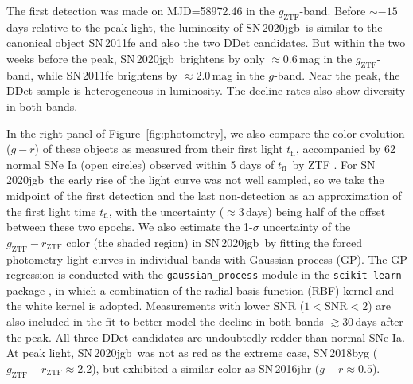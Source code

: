 \documentclass[twocolumn]{aastex631}
\newcommand{\sn}{SN\,2020jgb}
\newcommand{\tfl}{$t_\mathrm{fl}$}
\newcommand{\adam}[1]{\textcolor{red}{[AAM: #1]}}
\newcommand{\chang}[1]{\textcolor{blue}{[Chang: #1]}}
\begin{document}
The first detection was made on MJD=58972.46 in the $g_\mathrm{ZTF}$-band. Before $\sim$$-15$\,days relative to the peak light, the luminosity of \sn\ is similar to the canonical object SN\,2011fe and also the two DDet candidates. But within the two weeks before the peak, \sn\ brightens by only $\approx$0.6\,mag in the $g_\mathrm{ZTF}$-band, while SN\,2011fe brightens by $\approx$2.0\,mag in the $g$-band. %
Near the peak, the DDet sample is heterogeneous in luminosity. The decline rates also show diversity in both bands. %

In the right panel of Figure~\ref{fig:photometry}, we also compare the color evolution ($g-r$) of these objects as measured from their first light \tfl, accompanied by 62 normal SNe Ia (open circles) observed within 5 days of \tfl\ by ZTF \citep[from][]{Bulla2020}. For \sn\, the early rise of the light curve was not well sampled, so we take the midpoint of the first detection and the last non-detection as an approximation of the first light time \tfl, with the uncertainty ($\approx$3\,days) being half of the offset between these two epochs. We also estimate the 1-$\sigma$ uncertainty of the $g_\mathrm{ZTF}-r_\mathrm{ZTF}$ color (the shaded region) in \sn\ by fitting the forced photometry light curves in individual bands with Gaussian process (GP). The GP regression is conducted with the \texttt{gaussian\_process} module in the \texttt{scikit-learn} package \citep{scikit-learn}, in which a combination of the radial-basis function (RBF) kernel and the white kernel is adopted. Measurements with lower SNR ($1<\mathrm{SNR}<2$) are also included in the fit to better model the decline in both bands $\gtrsim$30\,days after the peak. %
All three DDet candidates are undoubtedly redder than normal SNe Ia. At peak light, \sn\ was not as red as the extreme case, SN\,2018byg ($g_\mathrm{ZTF}-r_\mathrm{ZTF}\approx2.2$), but exhibited a similar color as SN\,2016jhr ($g-r\approx0.5$). %
\end{document}
